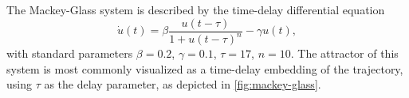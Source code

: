 The Mackey-Glass system is described by the time-delay differential equation
\begin{equation}
  \dot{u}(t) = \beta \frac{u(t - \tau)}{1 + u(t - \tau)^n} - \gamma u(t),
  \label{eq:mackey-glass}
\end{equation}
with standard parameters $\beta = 0.2$, $\gamma = 0.1$, $\tau = 17$,
$n = 10$.\cite{mackey1977} The attractor of this system is most
commonly visualized as a time-delay embedding of the trajectory, using
$\tau$ as the delay parameter, as depicted in \cref{fig:mackey-glass}.
